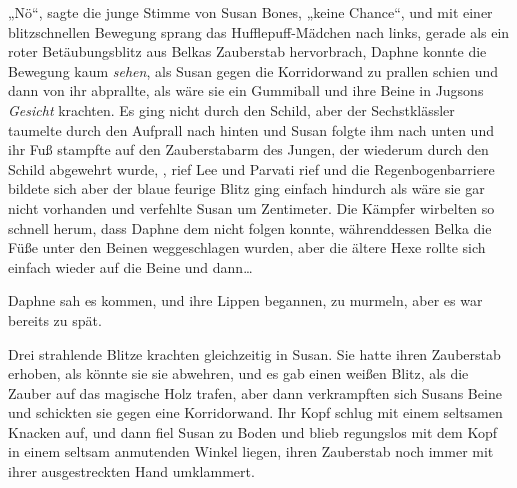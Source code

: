 „Nö“, sagte die junge Stimme von Susan Bones, „keine Chance“, und mit einer blitzschnellen Bewegung sprang das Hufflepuff-Mädchen nach links, gerade als ein roter Betäubungsblitz aus Belkas Zauberstab hervorbrach, Daphne konnte die Bewegung kaum \emph{sehen}, als Susan gegen die Korridorwand zu prallen schien und dann von ihr abprallte, als wäre sie ein Gummiball und ihre Beine in Jugsons \emph{Gesicht} krachten. Es ging nicht durch den Schild, aber der Sechstklässler taumelte durch den Aufprall nach hinten und Susan folgte ihm nach unten und ihr Fuß stampfte auf den Zauberstabarm des Jungen, der wiederum durch den Schild abgewehrt wurde, , rief Lee und Parvati rief  und die Regenbogenbarriere bildete sich aber der blaue feurige Blitz ging einfach hindurch als wäre sie gar nicht vorhanden und verfehlte Susan um Zentimeter. Die Kämpfer wirbelten so schnell herum, dass Daphne dem nicht folgen konnte, währenddessen Belka die Füße unter den Beinen weggeschlagen wurden, aber die ältere Hexe rollte sich einfach wieder auf die Beine und dann…

Daphne sah es kommen, und ihre Lippen begannen,  zu murmeln, aber es war bereits zu spät.

Drei strahlende Blitze krachten gleichzeitig in Susan. Sie hatte ihren Zauberstab erhoben, als könnte sie sie abwehren, und es gab einen weißen Blitz, als die Zauber auf das magische Holz trafen, aber dann verkrampften sich Susans Beine und schickten sie gegen eine Korridorwand. Ihr Kopf schlug mit einem seltsamen Knacken auf, und dann fiel Susan zu Boden und blieb regungslos mit dem Kopf in einem seltsam anmutenden Winkel liegen, ihren Zauberstab noch immer mit ihrer ausgestreckten Hand umklammert.

